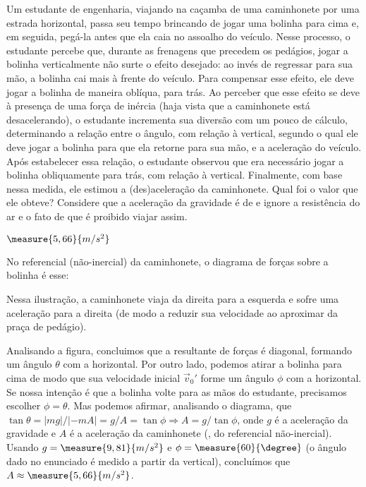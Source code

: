 \begin{question}
    Um estudante de engenharia, viajando na caçamba de uma caminhonete por uma estrada horizontal, passa seu tempo brincando de jogar uma bolinha para cima e, em seguida, pegá-la antes que ela caia no assoalho do veículo.
    Nesse processo, o estudante percebe que, durante as frenagens que precedem os pedágios, jogar a bolinha verticalmente não surte o efeito desejado: ao invés de regressar para sua mão, a bolinha cai mais à frente do veículo.
    Para compensar esse efeito, ele deve jogar a bolinha de maneira oblíqua, para trás.
    Ao perceber que esse efeito se deve à presença de uma força de inércia (haja vista que a caminhonete está desacelerando), o estudante incrementa sua diversão com um pouco de cálculo, determinando a relação entre o ângulo, com relação à vertical, segundo o qual ele deve jogar a bolinha para que ela retorne para sua mão, e a aceleração do veículo.
    Após estabelecer essa relação, o estudante observou que era necessário jogar a bolinha obliquamente para trás,  com relação à vertical.
    Finalmente, com base nessa medida, ele estimou a (des)aceleração da caminhonete.
    Qual foi o valor que ele obteve?
    Considere que a aceleração da gravidade é de  e ignore a resistência do ar e o fato de que é proibido viajar assim.

    \begin{answer}
      $\measure{5,66}{m/s^2}$
    \end{answer}

    \begin{solution}
      No referencial (não-inercial) da caminhonete, o diagrama de forças sobre a bolinha é esse:


      Nessa ilustração, a caminhonete viaja da direita para a esquerda e sofre uma aceleração para a direita (de modo a reduzir sua velocidade ao aproximar da praça de pedágio).

      Analisando a figura, concluimos que a resultante de forças é diagonal, formando um ângulo $\theta$ com a horizontal.
      Por outro lado, podemos atirar a bolinha para cima de modo que sua velocidade inicial $\vec v_0'$ forme um ângulo $\phi$ com a horizontal.
      Se nossa intenção é que a bolinha volte para as mãos do estudante, precisamos escolher $\phi = \theta$.
      Mas podemos afirmar, analisando o diagrama, que $\tan\theta = |mg|/|-mA|=g/A = \tan\phi \Rightarrow A = g/\tan\phi$, onde $g$ é a aceleração da gravidade e $A$ é a aceleração da caminhonete (\ie, do referencial não-inercial).
      Usando $g = \measure{9,81}{m/s^2}$ e $\phi = \measure{60}{\degree}$ (o ângulo dado no enunciado é medido a partir da vertical), concluímos que $A \approx \measure{5,66}{m/s^2}$.
    \end{solution}
\end{question}